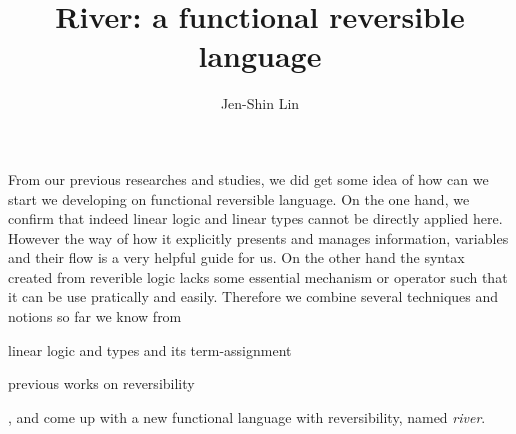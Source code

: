 \documentclass[a4paper]{article}
\title{River: a functional reversible language}
\author{Jen-Shin Lin}
\begin{document}
\maketitle

From our previous researches and studies, we did get some idea of how can we start we developing on functional reversible language. On the one hand, we confirm that indeed linear logic and linear types cannot be directly applied here. However the way of how it explicitly presents and manages information, variables and their flow is a very helpful guide for us. On the other hand the syntax created from reverible logic lacks some essential mechanism or operator such that it can be use pratically and easily. Therefore we combine several techniques and notions so far we know from
\begin{sublist}
\item linear logic and types and its term-assignment \cite{Benton92, Wadler93, Benton93, Ronchi94, Girard95, Turner98, Novitzka07}
\item previous works on reversibility \cite{Yokoyama11, Sparks14, Brown16, Yokoyama16}
\end{sublist}
, and come up with a new functional language with reversibility, named \textit{river}.
\end{document}
